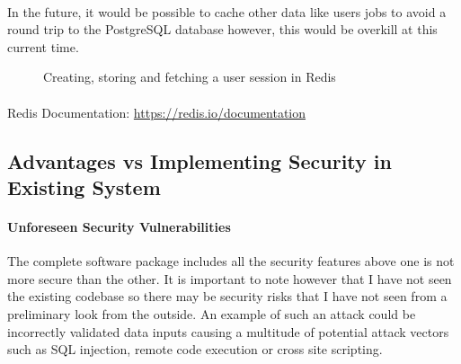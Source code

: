 \paragraph{} In the future, it would be possible to cache other data like users jobs to avoid a round trip to the PostgreSQL
database however, this would be overkill at this current time.

\begin{figure}[h!]
    \begin{center}
    \caption{Creating, storing and fetching a user session in Redis}
    \label{fig:example-session-use}
    \end{center}
\end{figure}

\paragraph{} Redis Documentation: \url{https://redis.io/documentation}

\subsection{Advantages vs Implementing Security in Existing System}\label{subsec:advantages-vs-implementing-security-in-existing-system}

\paragraph{Unforeseen Security Vulnerabilities} The complete software package includes all the security features above one is not more secure than the other.
It is important to note however that I have not seen the existing codebase so there may be security risks that I have not seen from
a preliminary look from the outside.
An example of such an attack could be incorrectly validated data inputs causing a multitude of potential attack vectors such as
SQL injection, remote code execution or cross site scripting.

